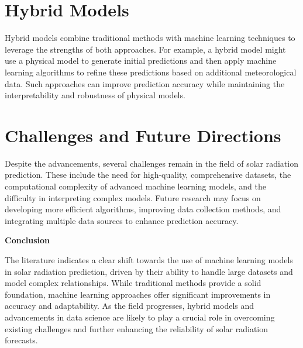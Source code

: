 \documentclass[12pt,a4paper]{report}
\begin{document}
\section{Hybrid Models}

Hybrid models combine traditional methods with machine learning techniques to leverage the strengths of both approaches. For example, a hybrid model might use a physical model to generate initial predictions and then apply machine learning algorithms to refine these predictions based on additional meteorological data. Such approaches can improve prediction accuracy while maintaining the interpretability and robustness of physical models.

\section{Challenges and Future Directions}

Despite the advancements, several challenges remain in the field of solar radiation prediction. These include the need for high-quality, comprehensive datasets, the computational complexity of advanced machine learning models, and the difficulty in interpreting complex models. Future research may focus on developing more efficient algorithms, improving data collection methods, and integrating multiple data sources to enhance prediction accuracy.

\textbf{Conclusion}

The literature indicates a clear shift towards the use of machine learning models in solar radiation prediction, driven by their ability to handle large datasets and model complex relationships. While traditional methods provide a solid foundation, machine learning approaches offer significant improvements in accuracy and adaptability. As the field progresses, hybrid models and advancements in data science are likely to play a crucial role in overcoming existing challenges and further enhancing the reliability of solar radiation forecasts.
\end{document}
